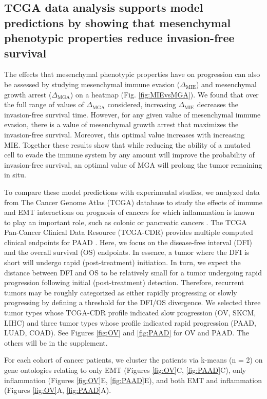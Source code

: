 \documentclass[11pt]{article}
\begin{document}
\subsection{TCGA data analysis supports model predictions by showing that mesenchymal phenotypic properties reduce invasion-free survival }\label{tcga}

The effects that mesenchymal phenotypic properties have on progression can also be assessed by studying mesenchymal immune evasion ($\Delta_\text{MIE}$) and mesenchymal growth arrest ($\Delta_\text{MGA}$) on a heatmap (Fig. \ref{fig:MIEvsMGA}). We found that over the full range of values of $\Delta_\text{MGA}$ considered, increasing $\Delta_\text{MIE}$ decreases the invasion-free survival time. However, for any given value of mesenchymal immune evasion, there is a value of mesenchymal growth arrest that maximizes the invasion-free survival. Moreover, this optimal value increases with increasing MIE. Together these results show that while reducing the ability of a mutated cell to evade the immune system by any amount will improve the probability of invasion-free survival, an optimal value of MGA will prolong the tumor remaining in situ. 
\par
To compare these model predictions with experimental studies, we analyzed data from The Cancer Genome Atlas (TCGA) database to study the effects of immune and EMT interactions on prognosis of cancers for which inflammation is known to play an important role, such as colonic or pancreatic cancers \cite{greten2019inflammation,hu2010inflammation}.
The TCGA Pan-Cancer Clinical Data Resource (TCGA-CDR) provides multiple computed clinical endpoints for PAAD \cite{liu2018integrated}.
Here, we focus on the disease-free interval (DFI) and the overall survival (OS) endpoints.
In essence, a tumor where the DFI is short will undergo rapid (post-treatment) initiation.
In turn, we expect the distance between DFI and OS to be relatively small for a tumor undergoing rapid progression following initial (post-treatment) detection.
Therefore, recurrent tumors may be roughly categorized as either rapidly progressing or slowly progressing by defining a threshold for the DFI/OS divergence.
We selected three tumor types whose TCGA-CDR profile indicated slow progression (OV, SKCM, LIHC) and three tumor types whose profile indicated rapid progression (PAAD, LUAD, COAD).
See Figures \ref{fig:OV} and \ref{fig:PAAD} for OV and PAAD. The others will be in the supplement.
\par
For each cohort of cancer patients, we cluster the patients via k-means (n = 2) on gene ontologies relating to only EMT (Figures \ref{fig:OV}C, \ref{fig:PAAD}C), only inflammation (Figures \ref{fig:OV}E, \ref{fig:PAAD}E), and both EMT and inflammation (Figures \ref{fig:OV}A, \ref{fig:PAAD}A).
\end{document}
